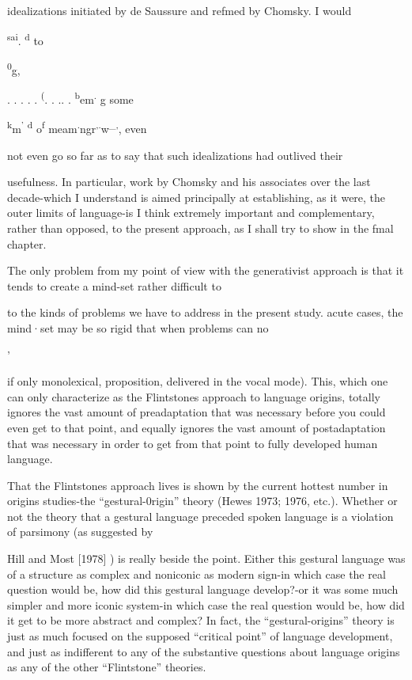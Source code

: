 idealizations initiated by de Saussure and refmed by Chomsky. I would

\textsuperscript{sa}\textsuperscript{i}. \textsuperscript{d} to

\textsuperscript{0}g,

\textsuperscript{{\textquotedbl}}. . . . .\textsuperscript{{\textquotedbl}} \textsuperscript{(}\textsuperscript{{\textquotedbl}}. . .. .\textsuperscript{{\textquotedbl}} \textsuperscript{b}em\textsuperscript{.} g some

\textsuperscript{k}m\textsuperscript{'} \textsuperscript{d} o\textsuperscript{f} meam\textsuperscript{.}ngr\textsuperscript{,}\textsuperscript{.}w\textsuperscript{\_}\textsuperscript{,}, even

not even go so far as to say that such idealizations had outlived their

usefulness. In particular, work by Chomsky and his associates over the last decade-which I understand is aimed principally at establishing, as it were, the outer limits of language-is I think extremely important and complementary, rather than opposed, to the present approach, as I shall try to show in the fmal chapter.

The only problem from my point of view with the generativist approach is that it tends to create a mind-set rather difficult to

to the kinds of problems we have to address in the present study. acute cases, the mind·set may be so rigid that when problems can no

'

if only monolexical, proposition, delivered in the vocal mode). This, which one can only characterize as the Flintstones approach to lan\-guage origins, totally ignores the vast amount of preadaptation that was necessary before you could even get to that point, and equally ignores the vast amount of postadaptation that was necessary in order to get from that point to fully developed human language.

That the Flintstones approach lives is shown by the current hottest number in origins studies-the ``gestural-0rigin'' theory (Hewes 1973; 1976, etc.). Whether or not the theory that a gestural language preceded spoken language is a violation of parsimony (as suggested by


Hill and Most [1978] ) is really beside the point. Either this gestural language was of a structure as complex and noniconic as modern sign-in which case the real question would be, how did this gestural language develop?-or it was some much simpler and more iconic system-in which case the real question would be, how did it get to be more abstract and complex? In fact, the ``gestural-origins'' theory is just as much focused on the supposed ``critical point'' of language development, and just as indifferent to any of the substantive questions about language origins as any of the other ``Flintstone'' theories.

